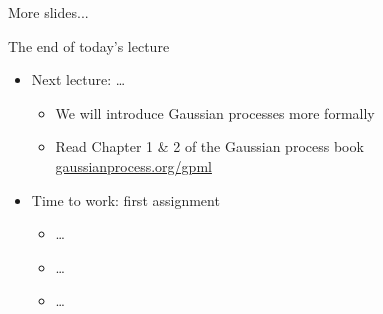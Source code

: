 \begin{frame}{More slides...}
\end{frame}


\begin{frame}{The end of today's lecture}
\begin{itemize}
	\item Next lecture: \dots
	\begin{itemize}[<+->]
		\item We will introduce Gaussian processes more formally
		\item Read Chapter 1 \& 2 of the Gaussian process book \url{gaussianprocess.org/gpml}
	\end{itemize}

	\vspace{10mm}

	\item Time to work: first assignment
	\begin{itemize}[<+->]
	    \item \dots
		\item \dots
    	\item \dots
	\end{itemize}
\end{itemize}
\end{frame}



